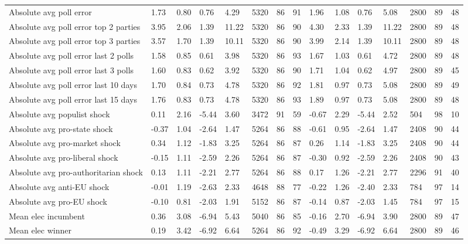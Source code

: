 \begin{longtable}{lllllllllllllll}
Absolute avg poll error & 1.73 & 0.80 & 0.76 & 4.29 & 5320 & 86 & 91 & 1.96 & 1.08 & 0.76 & 5.08 & 2800 & 89 & 48\\
Absolute avg poll error top 2 parties & 3.95 & 2.06 & 1.39 & 11.22 & 5320 & 86 & 90 & 4.30 & 2.33 & 1.39 & 11.22 & 2800 & 89 & 48\\
Absolute avg poll error top 3 parties & 3.57 & 1.70 & 1.39 & 10.11 & 5320 & 86 & 90 & 3.99 & 2.14 & 1.39 & 10.11 & 2800 & 89 & 48\\
Absolute avg poll error last 2 polls & 1.58 & 0.85 & 0.61 & 3.98 & 5320 & 86 & 93 & 1.67 & 1.03 & 0.61 & 4.72 & 2800 & 89 & 48\\
\addlinespace
Absolute avg poll error last 3 polls & 1.60 & 0.83 & 0.62 & 3.92 & 5320 & 86 & 90 & 1.71 & 1.04 & 0.62 & 4.97 & 2800 & 89 & 45\\
Absolute avg poll error last 10 days & 1.70 & 0.84 & 0.73 & 4.78 & 5320 & 86 & 92 & 1.81 & 0.97 & 0.73 & 5.08 & 2800 & 89 & 49\\
Absolute avg poll error last 15 days & 1.76 & 0.83 & 0.73 & 4.78 & 5320 & 86 & 93 & 1.89 & 0.97 & 0.73 & 5.08 & 2800 & 89 & 48\\
Absolute avg populist shock & 0.11 & 2.16 & -5.44 & 3.60 & 3472 & 91 & 59 & -0.67 & 2.29 & -5.44 & 2.52 & 504 & 98 & 10\\
Absolute avg pro-state shock & -0.37 & 1.04 & -2.64 & 1.47 & 5264 & 86 & 88 & -0.61 & 0.95 & -2.64 & 1.47 & 2408 & 90 & 44\\
\addlinespace
Absolute avg pro-market shock & 0.34 & 1.12 & -1.83 & 3.25 & 5264 & 86 & 87 & 0.26 & 1.14 & -1.83 & 3.25 & 2408 & 90 & 44\\
Absolute avg pro-liberal shock & -0.15 & 1.11 & -2.59 & 2.26 & 5264 & 86 & 87 & -0.30 & 0.92 & -2.59 & 2.26 & 2408 & 90 & 43\\
Absolute avg pro-authoritarian shock & 0.13 & 1.11 & -2.21 & 2.77 & 5264 & 86 & 88 & 0.17 & 1.26 & -2.21 & 2.77 & 2296 & 91 & 40\\
Absolute avg anti-EU shock & -0.01 & 1.19 & -2.63 & 2.33 & 4648 & 88 & 77 & -0.22 & 1.26 & -2.40 & 2.33 & 784 & 97 & 14\\
Absolute avg pro-EU shock & -0.10 & 0.81 & -2.03 & 1.91 & 5152 & 86 & 87 & -0.14 & 0.87 & -2.03 & 1.45 & 784 & 97 & 15\\
\addlinespace
Mean elec incumbent & 0.36 & 3.08 & -6.94 & 5.43 & 5040 & 86 & 85 & -0.16 & 2.70 & -6.94 & 3.90 & 2800 & 89 & 47\\
Mean elec winner & 0.19 & 3.42 & -6.92 & 6.64 & 5264 & 86 & 92 & -0.49 & 3.29 & -6.92 & 6.64 & 2800 & 89 & 46\\

\end{longtable}
